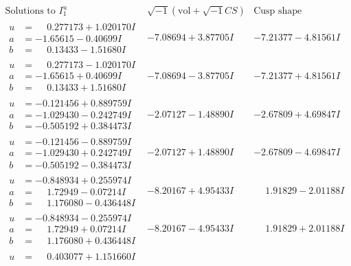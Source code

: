 \documentclass[1p]{elsarticle_modified}
\theoremstyle{definition}
\newcommand{\I}{\sqrt{-1}}
\begin{document}
$$\begin{array}{c|c|c}  
\text{Solutions to }I^u_{1}& \I (\text{vol} + \sqrt{-1}CS) & \text{Cusp shape}\\
 \hline 
\begin{aligned}
u &= \phantom{-}0.277173 + 1.020170 I \\
a &= -1.65615 - 0.40699 I \\
b &= \phantom{-}0.13433 - 1.51680 I\end{aligned}
 & -7.08694 + 3.87705 I & -7.21377 - 4.81561 I \\ \hline\begin{aligned}
u &= \phantom{-}0.277173 - 1.020170 I \\
a &= -1.65615 + 0.40699 I \\
b &= \phantom{-}0.13433 + 1.51680 I\end{aligned}
 & -7.08694 - 3.87705 I & -7.21377 + 4.81561 I \\ \hline\begin{aligned}
u &= -0.121456 + 0.889759 I \\
a &= -1.029430 - 0.242749 I \\
b &= -0.505192 + 0.384473 I\end{aligned}
 & -2.07127 - 1.48890 I & -2.67809 + 4.69847 I \\ \hline\begin{aligned}
u &= -0.121456 - 0.889759 I \\
a &= -1.029430 + 0.242749 I \\
b &= -0.505192 - 0.384473 I\end{aligned}
 & -2.07127 + 1.48890 I & -2.67809 - 4.69847 I \\ \hline\begin{aligned}
u &= -0.848934 + 0.255974 I \\
a &= \phantom{-}1.72949 - 0.07214 I \\
b &= \phantom{-}1.176080 - 0.436448 I\end{aligned}
 & -8.20167 + 4.95433 I & \phantom{-}1.91829 - 2.01188 I \\ \hline\begin{aligned}
u &= -0.848934 - 0.255974 I \\
a &= \phantom{-}1.72949 + 0.07214 I \\
b &= \phantom{-}1.176080 + 0.436448 I\end{aligned}
 & -8.20167 - 4.95433 I & \phantom{-}1.91829 + 2.01188 I \\ \hline\begin{aligned}
u &= \phantom{-}0.403077 + 1.151660 I \\

\end{aligned}
\end{array}$$
\end{document}
